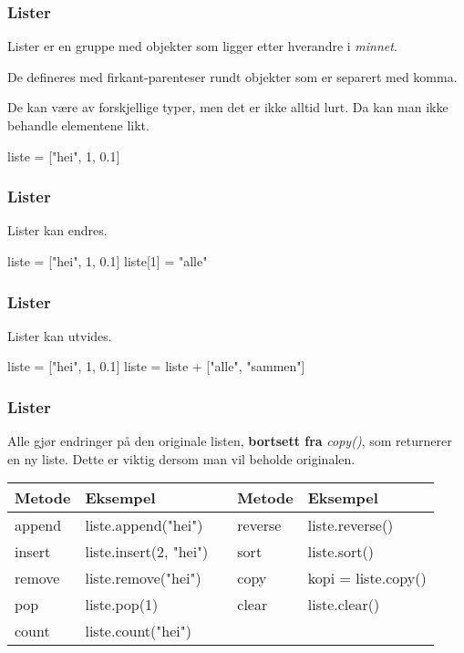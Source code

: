 
\begin{frame}[fragile]
    \frametitle{Lister}

    Lister er en gruppe med objekter som ligger etter hverandre i \textit{minnet}. 
    
    De defineres med firkant-parenteser rundt objekter som er separert med komma. 
    
    De kan være av forskjellige typer, men det er ikke alltid lurt. Da kan man ikke behandle elementene likt. 

\begin{python}
liste = ["hei", 1, 0.1]
\end{python}

\end{frame}

\begin{frame}[fragile]
    \frametitle{Lister}

    Lister kan endres.

\begin{python}
liste = ["hei", 1, 0.1]
liste[1] = "alle"
\end{python}

\end{frame}

\begin{frame}[fragile]
    \frametitle{Lister}

    Lister kan utvides. 

\begin{python}
liste = ["hei", 1, 0.1]
liste = liste + ["alle", "sammen"]
\end{python}

\end{frame}

\begin{frame}
    \frametitle{Lister}

    Alle gjør endringer på den originale listen, \textbf{bortsett fra} \textit{copy()}, som returnerer en ny liste. Dette er viktig dersom man vil beholde originalen. 

    \begin{table}[]
        \begin{tabular}{|l|l|l|l|l|}
        \hline
        Metode & Eksempel               &  & Metode  & Eksempel        \\ \hline
        append & liste.append("hei")    &  & reverse & liste.reverse() \\ \hline
        insert & liste.insert(2, "hei") &  & sort    & liste.sort()    \\ \hline
        remove & liste.remove("hei")    &  & copy    & kopi = liste.copy()    \\ \hline
        pop    & liste.pop(1)           &  & clear   & liste.clear()   \\ \hline
        count  & liste.count("hei")     &  &         &                 \\ \hline
        \end{tabular}
    \end{table}

\end{frame}

